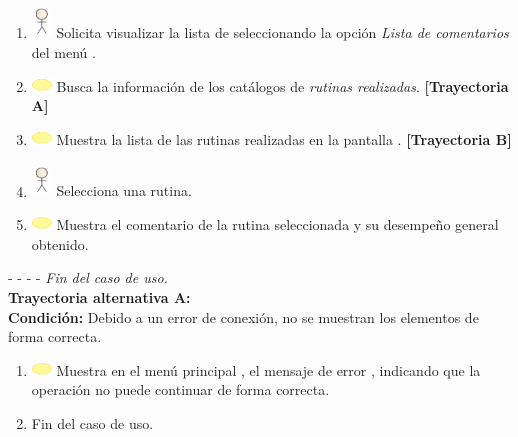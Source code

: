 \begin{enumerate}
	\item \includegraphics[width=15pt, height=25pt]{./Figuras/iconosCU/usuario.png} Solicita visualizar la lista de seleccionando la opción \textit{Lista de comentarios} del menú .
		\item \includegraphics[width=15pt]{./Figuras/iconosCU/herramienta.png} Busca la información de los catálogos de \textit{rutinas realizadas}. \textbf{[Trayectoria A]}
	\item \includegraphics[width=15pt]{./Figuras/iconosCU/herramienta.png} Muestra la lista de las rutinas realizadas en la pantalla . \textbf{[Trayectoria B]}
	\item \includegraphics[width=15pt, height=25pt]{./Figuras/iconosCU/usuario.png} Selecciona una rutina.
	\item \includegraphics[width=15pt]{./Figuras/iconosCU/herramienta.png} Muestra el comentario de la rutina seleccionada y su desempeño general obtenido.
\end{enumerate}
	
- - - - \textit{Fin del caso de uso.} \\

\textbf{\large{Trayectoria alternativa A:}}\\
\textbf{Condición: } Debido a un error de conexión, no se muestran los elementos de forma correcta.

\begin{enumerate}
	\item \includegraphics[width=15pt]{./Figuras/iconosCU/herramienta.png} Muestra en el menú principal , el mensaje de error , indicando que la operación no puede continuar de forma correcta.
	\item Fin del caso de uso.
\end{enumerate}

